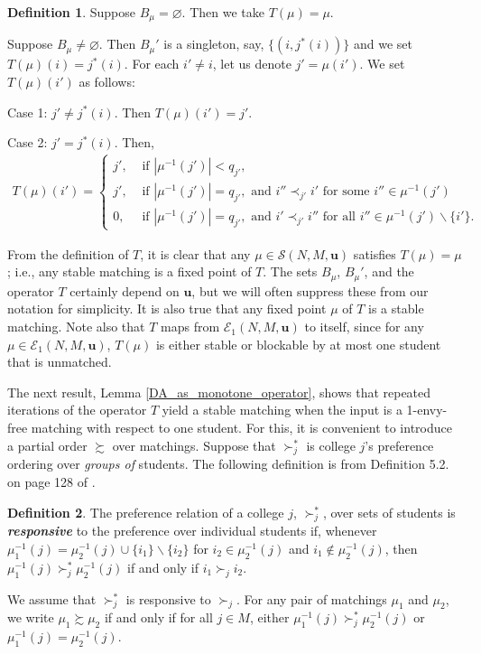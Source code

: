 \documentclass[12pt, fullpage]{amsart}
\theoremstyle{definition}
\newtheorem{definition}{Definition}[section]
\theoremstyle{definition}
\theoremstyle{definition}
\begin{document}
\begin{bibunit}[econometrica]
\begin{definition}
	Suppose $B_{\mu}=\varnothing$. Then we take $T(\mu)=\mu$.
	
	Suppose $B_{\mu}\neq\varnothing$. Then $B_\mu'$ is a singleton, say, $\{(i,j^*(i))\}$ and we set $T(\mu)(i)=j^{*}(i)$. For each $i' \ne i$, let us denote $j' = \mu(i')$. We set $T(\mu)(i')$ as follows:
	
	\quad Case 1: $j'\neq j^{*}(i)$. Then $T(\mu)(i')=j'$. 
	
	\quad Case 2: $j'=j^{*}(i)$. Then,
	\begin{align}
		T(\mu)(i') = \left\{ \begin{array}{ll}
			j',& \text{ if } |\mu^{-1}(j')|<q_{j'},\\
			j',& \text{ if }  |\mu^{-1}(j')|=q_{j'}, \text{ and } i''\prec_{j'}i' \text{ for some }i''\in\mu^{-1}(j')\\
			0,& \text{ if }  |\mu^{-1}(j')|=q_{j'}, \text{ and } i'\prec_{j'}i'' \text{ for all }i''\in\mu^{-1}(j')\backslash \{i'\}.
		\end{array}
		\right.
	\end{align}
\end{definition}\medskip

From the definition of $T$, it is clear that any $\mu\in\mathcal{S}(N,M,\boldsymbol{u})$
satisfies $T(\mu)=\mu$; i.e., any stable matching is a fixed point
of $T$. The sets $B_{\mu}$, $B_{\mu}'$, and the operator $T$ certainly
	depend on $\boldsymbol{u}$, but we will often suppress these from
	our notation for simplicity. It is also true that any fixed point $\mu$ of $T$ is a stable matching. Note also that $T$ maps from $\mathcal{E}_1(N,M,\boldsymbol{u})$ to itself,
since for any $\mu\in\mathcal{E}_1(N,M,\boldsymbol{u})$, $T(\mu)$
is either stable or blockable by at most one student that is unmatched.

The next result, Lemma \ref{DA_as_monotone_operator}, shows that
repeated iterations of the operator $T$ yield a stable matching when the input is a 1-envy-free matching with respect
to one student. For this, it is convenient to introduce a partial order $\succsim$ over matchings. Suppose that $\succ_j^*$ is college $j$'s preference ordering over \textit{groups of} students. The following definition is from Definition 5.2. on page 128 of \cite{Roth/Sotomayor:90:TwoSidedMatching}.
\begin{definition}\label{def:responsiveness}
	The preference relation of a college $j$, $\succ_{j}^*$, over sets
	of students is \textbf{\textit{responsive}} to the preference over
	individual students if, whenever $\mu_{1}^{-1}(j)=\mu_{2}^{-1}(j)\cup\{i_{1}\}\backslash\{i_{2}\}$
	for $i_{2}\in\mu_{2}^{-1}(j)$ and $i_{1}\notin\mu_{2}^{-1}(j)$,
	then $\mu_{1}^{-1}(j)\succ_{j}^*\mu_{2}^{-1}(j)$ if and only if $i_{1}\succ_{j}i_{2}$.
\end{definition}
We assume that $\succ_j^*$ is responsive to $\succ_j$. For any pair of matchings $\mu_{1}$ and $\mu_{2}$, we write $\mu_{1}\succsim \mu_{2}$
if and only if for all $j\in M$, either $\mu_{1}^{-1}(j)\succ_j^* \mu_{2}^{-1}(j)$
or $\mu_{1}^{-1}(j)=\mu_{2}^{-1}(j)$. 


\end{bibunit}
\end{document}
